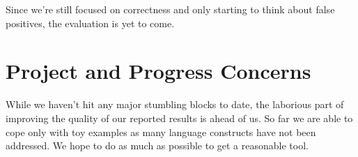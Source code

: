 \documentclass[12pt]{article}
\begin{document}
Since we're still focused on correctness and only starting to think about false positives, the evaluation is yet to come.

\section{Project and Progress Concerns}

While we haven't hit any major stumbling blocks to date, the laborious part of improving the quality of our reported results is ahead of us. So far we are able to cope only with toy examples as many language constructs have not been addressed. We hope to do as much as possible to get a reasonable tool.



\end{document}
